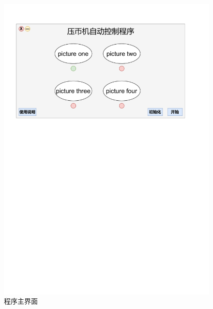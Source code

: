 \documentclass[UTF8,14pt]{article}
\begin{document}
\begin{figure}[!h]
	\centering
	\includegraphics[width=16cm]{figures/界面开发.pdf}
	\caption{程序主界面}
\end{figure}
\end{document}
